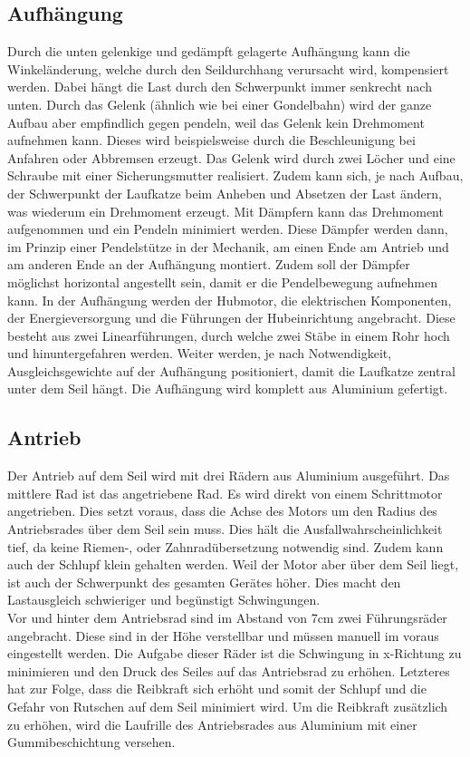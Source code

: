 \documentclass[a4paper]{report}
\begin{document}
\subsection{Aufhängung}
Durch die unten gelenkige und gedämpft gelagerte Aufhängung kann die Winkeländerung, welche durch den Seildurchhang verursacht wird, kompensiert werden. Dabei hängt die Last durch den Schwerpunkt immer senkrecht nach unten. Durch das Gelenk (ähnlich wie bei einer Gondelbahn) wird der ganze Aufbau aber empfindlich gegen pendeln, weil das Gelenk kein Drehmoment aufnehmen kann. Dieses wird beispielsweise durch die Beschleunigung bei Anfahren oder Abbremsen erzeugt. Das Gelenk wird durch zwei Löcher und eine Schraube mit einer Sicherungsmutter realisiert. Zudem kann sich, je nach Aufbau, der Schwerpunkt der Laufkatze beim Anheben und Absetzen der Last ändern, was wiederum ein Drehmoment erzeugt. Mit Dämpfern kann das Drehmoment aufgenommen und ein Pendeln minimiert werden. Diese Dämpfer werden dann, im Prinzip einer Pendelstütze in der Mechanik, am einen Ende am Antrieb und am anderen Ende an der Aufhängung montiert. Zudem soll der Dämpfer möglichst horizontal angestellt sein, damit er die Pendelbewegung aufnehmen kann. In der Aufhängung werden der Hubmotor, die elektrischen Komponenten, der Energieversorgung und die Führungen der Hubeinrichtung angebracht. Diese besteht aus zwei Linearführungen, durch welche zwei Stäbe in einem Rohr hoch und hinuntergefahren werden. Weiter werden, je nach Notwendigkeit, Ausgleichsgewichte auf der Aufhängung positioniert, damit die Laufkatze zentral unter dem Seil hängt. Die Aufhängung wird komplett aus Aluminium gefertigt.

\subsection{Antrieb}
Der Antrieb auf dem Seil wird mit drei Rädern aus Aluminium ausgeführt. Das mittlere Rad ist das angetriebene Rad. Es wird direkt von einem Schrittmotor angetrieben. Dies setzt voraus, dass die Achse des Motors um den Radius des Antriebsrades über dem Seil sein muss. Dies hält die Ausfallwahrscheinlichkeit tief, da keine Riemen-, oder Zahnradübersetzung notwendig sind. Zudem kann auch der Schlupf klein gehalten werden. Weil der Motor aber über dem Seil liegt, ist auch der Schwerpunkt des gesamten Gerätes höher. Dies macht den Lastausgleich schwieriger und begünstigt Schwingungen.
\\
Vor und hinter dem Antriebsrad sind im Abstand von 7cm zwei Führungsräder angebracht. Diese sind in der Höhe verstellbar und müssen manuell im voraus eingestellt werden. Die Aufgabe dieser Räder ist die Schwingung in x-Richtung zu minimieren und den Druck des Seiles auf das Antriebsrad zu erhöhen. Letzteres hat zur Folge, dass die Reibkraft sich erhöht und somit der Schlupf und die Gefahr von Rutschen auf dem Seil minimiert wird. Um die Reibkraft zusätzlich zu erhöhen, wird die Laufrille des Antriebsrades aus Aluminium mit einer Gummibeschichtung versehen.
\end{document}
